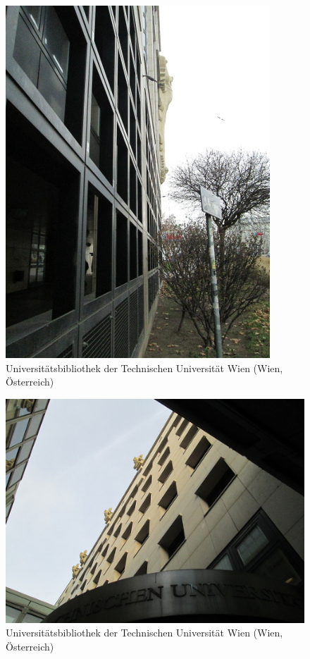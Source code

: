 \documentclass[a4paper,
fontsize=11pt,
oneside,
numbers=noperiodatend,
parskip=half-,
bibliography=totoc,
final
]{scrartcl}
\begin{document}
\begin{figure}[htbp]
\centering
\includegraphics{./img/043.jpg}
\caption{Universitätsbibliothek der Technischen Universität Wien
(Wien,
Österreich)}
\end{figure}

\begin{figure}[htbp]
\centering
\includegraphics{./img/044.jpg}
\caption{Universitätsbibliothek der Technischen Universität Wien
(Wien,
Österreich)}
\end{figure}
\end{document}

